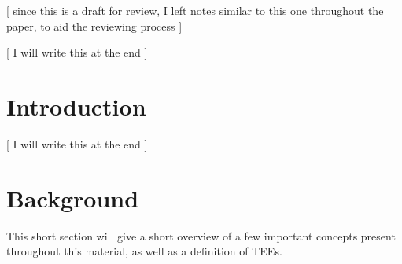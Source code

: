 \documentclass[runningheads,a4paper]{uwsese}
\begin{document}
\mainmatter 

\title{}%
\subtitle{Seminar Software Engineering}

\titlerunning{} %

\date{Winter Semester 2023}


\author{} %
%
\authorrunning{} %


\maketitle

\begin{abstract}



\end{abstract}

[ since this is a draft for review, I left notes similar to this one throughout the paper, to aid the reviewing process ]

[ I will write this at the end ]

\section{Introduction}

[ I will write this at the end ]

\section{Background}

This short section will give a short overview of a few important concepts
present throughout this material, as well as a definition of TEEs. 
\end{document}

